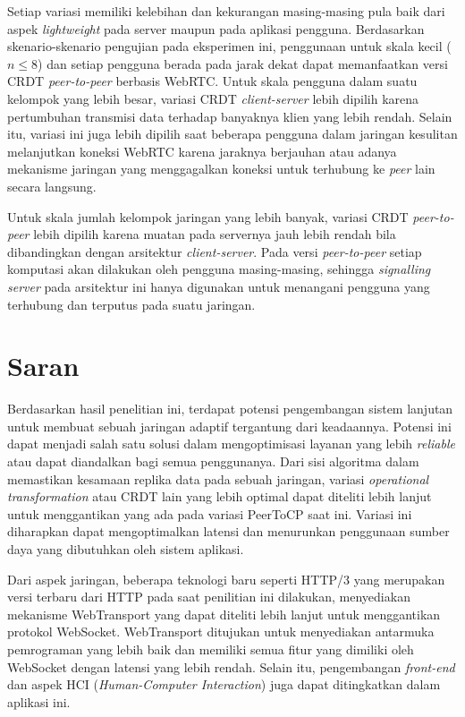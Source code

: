 Setiap variasi memiliki kelebihan dan kekurangan masing-masing pula baik dari aspek \textit{lightweight} pada server maupun pada aplikasi pengguna. Berdasarkan skenario-skenario pengujian pada eksperimen ini, penggunaan untuk skala kecil ($n \leq 8$) dan setiap pengguna berada pada jarak dekat dapat memanfaatkan versi CRDT \textit{peer-to-peer} berbasis WebRTC. Untuk skala pengguna dalam suatu kelompok yang lebih besar, variasi CRDT \textit{client-server} lebih dipilih karena pertumbuhan transmisi data terhadap banyaknya klien yang lebih rendah. Selain itu, variasi ini juga lebih dipilih saat beberapa pengguna dalam jaringan kesulitan melanjutkan koneksi WebRTC karena jaraknya berjauhan atau adanya mekanisme jaringan yang menggagalkan koneksi untuk terhubung ke \textit{peer} lain secara langsung.

Untuk skala jumlah kelompok jaringan yang lebih banyak, variasi CRDT \textit{peer-to-peer} lebih dipilih karena muatan pada servernya jauh lebih rendah bila dibandingkan dengan arsitektur \textit{client-server}. Pada versi \textit{peer-to-peer} setiap komputasi akan dilakukan oleh pengguna masing-masing, sehingga \textit{signalling server} pada arsitektur ini hanya digunakan untuk menangani pengguna yang terhubung dan terputus pada suatu jaringan.

\section{Saran}
\label{sec:saran}

Berdasarkan hasil penelitian ini, terdapat potensi pengembangan sistem lanjutan untuk membuat sebuah jaringan adaptif tergantung dari keadaannya. Potensi ini dapat menjadi salah satu solusi dalam mengoptimisasi layanan yang lebih \textit{reliable} atau dapat diandalkan bagi semua penggunanya. Dari sisi algoritma dalam memastikan kesamaan replika data pada sebuah jaringan, variasi \textit{operational transformation} atau CRDT lain yang lebih optimal dapat diteliti lebih lanjut untuk menggantikan yang ada pada variasi PeerToCP saat ini. Variasi ini diharapkan dapat mengoptimalkan latensi dan menurunkan penggunaan sumber daya yang dibutuhkan oleh sistem aplikasi.

Dari aspek jaringan, beberapa teknologi baru seperti HTTP/3 yang merupakan versi terbaru dari HTTP pada saat penilitian ini dilakukan, menyediakan mekanisme WebTransport yang dapat diteliti lebih lanjut untuk menggantikan protokol WebSocket. WebTransport ditujukan untuk menyediakan antarmuka pemrograman yang lebih baik dan memiliki semua fitur yang dimiliki oleh WebSocket dengan latensi yang lebih rendah. Selain itu, pengembangan \textit{front-end} dan aspek HCI (\textit{Human-Computer Interaction}) juga dapat ditingkatkan dalam aplikasi ini.

